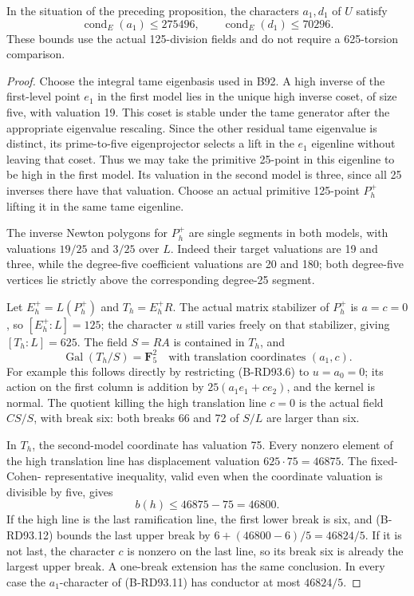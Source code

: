 \begin{lemma}
\label{lem:B-RD93-terminal-bound}
In the situation of the preceding proposition, the characters
\(a_1,d_1\) of \(U\) satisfy
\[
 \operatorname{cond}_E(a_1)\le275496,
 \qquad \operatorname{cond}_E(d_1)\le70296.             \tag{B-RD93.10}
\]
These bounds use the actual 125-division fields and do not
require a 625-torsion comparison.
\end{lemma}
\begin{proof}
Choose the integral tame eigenbasis used in B92. A high inverse
of the first-level point \(e_1\) in the first model lies in
the unique high inverse coset, of size five, with valuation 19.
This coset is stable under the tame generator after the
appropriate eigenvalue rescaling. Since the other residual
tame eigenvalue is distinct, its prime-to-five eigenprojector
selects a lift in the \(e_1\) eigenline without leaving that
coset. Thus we may take the primitive 25-point in this
eigenline to be high in the first model. Its valuation in
the second model is three, since all 25 inverses there have
that valuation. Choose an actual primitive 125-point \(P_h^+\)
lifting it in the same tame eigenline.

The inverse Newton polygons for \(P_h^+\) are single segments
in both models, with valuations \(19/25\) and \(3/25\)
over \(L\). Indeed their target valuations are 19 and three,
while the degree-five coefficient valuations are 20 and 180;
both degree-five vertices lie strictly above the corresponding
degree-25 segment.

Let \(E_h^+=L(P_h^+)\) and \(T_h=E_h^+R\). The actual
matrix stabilizer of \(P_h^+\) is \(a=c=0\), so
\([E_h^+:L]=125\); the character \(u\) still varies freely
on that stabilizer, giving \([T_h:L]=625\). The field
\(S=RA\) is contained in \(T_h\), and
\[
 \operatorname{Gal}(T_h/S)=\mathbf F_5^2
 \quad\text{with translation coordinates }(a_1,c).
                                                               \tag{B-RD93.11}
\]
For example this follows directly by restricting (B-RD93.6)
to \(u=a_0=0\); its action on the first column is addition
by \(25(a_1e_1+ce_2)\), and the kernel is normal. The
quotient killing the high translation line \(c=0\) is
the actual field \(CS/S\), with break six: both breaks
66 and 72 of \(S/L\) are larger than six.

In \(T_h\), the second-model coordinate has valuation 75.
Every nonzero element of the high translation line has
displacement valuation \(625\cdot75=46875\). The fixed-Cohen-
representative inequality, valid even when the coordinate
valuation is divisible by five, gives
\[
                    b(h)\le46875-75=46800.             \tag{B-RD93.12}
\]
If the high line is the last ramification line, the first
lower break is six, and (B-RD93.12) bounds the last upper
break by \(6+(46800-6)/5=46824/5\). If it is not last,
the character \(c\) is nonzero on the last line, so its
break six is already the largest upper break. A one-break
extension has the same conclusion. In every case the
\(a_1\)-character of (B-RD93.11) has conductor at most
\(46824/5\).


\end{proof}
